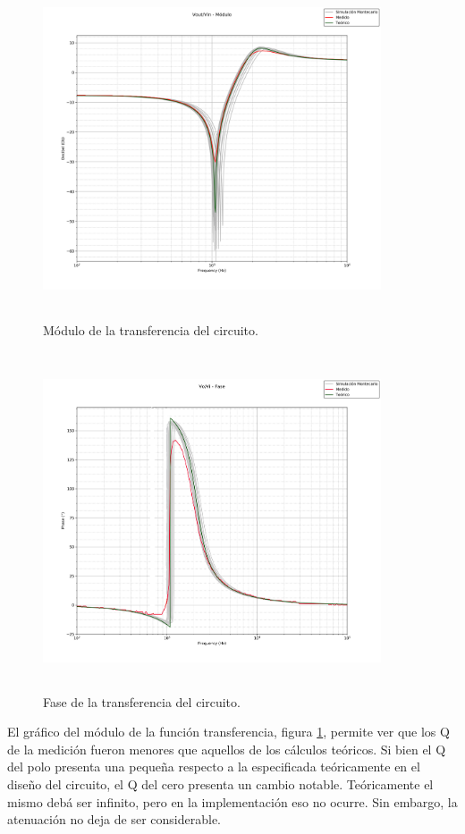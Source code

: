 \begin{figure}[H] %
	\centering
	\includegraphics[width=10cm,height=10cm,keepaspectratio]{../EJ1/00GRAFICOS/vovi.png}
	\caption{M\'odulo de la transferencia del circuito.}
	\label{vovi_mod}
\end{figure}

\begin{figure}[H] %
	\centering
	\includegraphics[width=10cm,height=10cm,keepaspectratio]{../EJ1/00GRAFICOS/vovifase.jpg}
	\caption{Fase de la transferencia del circuito.}
	\label{vovi_fase}
\end{figure}

El gr\'afico del m\'odulo de la funci\'on transferencia, figura \ref{vovi_mod}, permite ver que los Q de la medici\'on fueron menores que aquellos de los c\'alculos te\'oricos. Si bien el Q del polo presenta una peque\~na respecto a la especificada te\'oricamente en el dise\~no del circuito, el Q del cero presenta un cambio notable. Te\'oricamente el mismo deb\'a ser infinito, pero en la implementaci\'on eso no ocurre. Sin embargo, la atenuaci\'on no deja de ser considerable.


